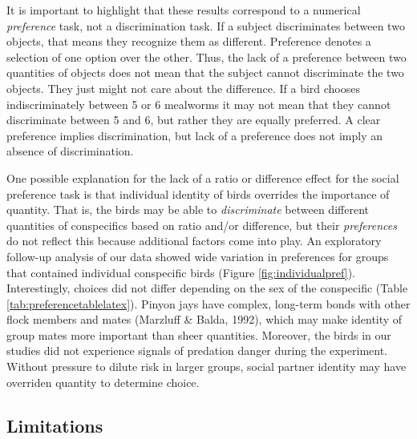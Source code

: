 \documentclass[
  ,pub,floatsintext]{apa6}
\begin{document}
It is important to highlight that these results correspond to a numerical \emph{preference} task, not a discrimination task. If a subject discriminates between two objects, that means they recognize them as different. Preference denotes a selection of one option over the other. Thus, the lack of a preference between two quantities of objects does not mean that the subject cannot discriminate the two objects. They just might not care about the difference. If a bird chooses indiscriminately between 5 or 6 mealworms it may not mean that they cannot discriminate between 5 and 6, but rather they are equally preferred. A clear preference implies discrimination, but lack of a preference does not imply an absence of discrimination.

One possible explanation for the lack of a ratio or difference effect for the social preference task is that individual identity of birds overrides the importance of quantity. That is, the birds may be able to \emph{discriminate} between different quantities of conspecifics based on ratio and/or difference, but their \emph{preferences} do not reflect this because additional factors come into play. An exploratory follow-up analysis of our data showed wide variation in preferences for groups that contained individual conspecific birds (Figure \ref{fig:individualpref}). Interestingly, choices did not differ depending on the sex of the conspecific (Table \ref{tab:preferencetablelatex}). Pinyon jays have complex, long-term bonds with other flock members and mates (Marzluff \& Balda, 1992), which may make identity of group mates more important than sheer quantities. Moreover, the birds in our studies did not experience signals of predation danger during the experiment. Without pressure to dilute risk in larger groups, social partner identity may have overriden quantity to determine choice.

\hypertarget{limitations}{%
\subsection{Limitations}\label{limitations}}
\end{document}
